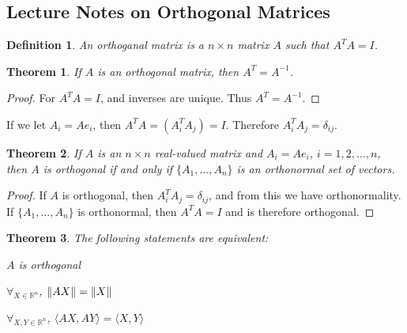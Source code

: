 \documentclass[oneside]{book}
\theoremstyle{mystyle}
\newtheorem{theorem}{Theorem}[section]
\newtheorem{definition}{Definition}[section]
\DeclarePairedDelimiter\norm{\lVert}{\rVert}
\begin{document}
\subsection{Lecture Notes on Orthogonal Matrices}
\begin{definition}
An orthoganal matrix is a $n\times n$ matrix $A$ such that $A^{T}A = I$.
\end{definition}
\begin{theorem}
If $A$ is an orthogonal matrix, then $A^T = A^{-1}$.
\end{theorem}
\begin{proof}
For $A^TA = I$, and inverses are unique. Thus $A^T = A^{-1}$.
\end{proof}
If we let $A_{i} = Ae_{i}$, then $A^TA = (A_{i}^{T}A_{j}) = I$. Therefore $A_i^TA_j = \delta_{ij}$.
\begin{theorem}
If $A$ is an $n\times n$ real-valued matrix and $A_i = Ae_i$, $i=1,2,\hdots, n$, then $A$ is orthogonal if and only if $\{A_1,\hdots, A_n\}$ is an orthonormal set of vectors.
\end{theorem}
\begin{proof}
If $A$ is orthogonal, then $A_{i}^{T}A_{j} = \delta_{ij}$, and from this we have orthonormality. If $\{A_1,\hdots, A_n\}$ is orthonormal, then $A^TA = I$ and is therefore orthogonal.
\end{proof}
\begin{theorem}
The following statements are equivalent:
\begin{enumerate}
\begin{multicols}{3}
    \item $A$ is orthogonal
    \item $\forall_{X\in\mathbb{R}^{n}}$, $\norm{AX} = \norm{X}$
    \item $\forall_{X,Y\in\mathbb{R}^{n}}$, $\langle AX, AY\rangle = \langle X, Y\rangle$
\end{multicols}
\end{enumerate}
\end{theorem}
\end{document}
